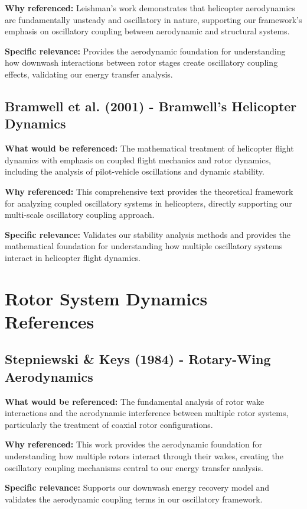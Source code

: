 \documentclass{article}
\begin{document}
\textbf{Why referenced:} Leishman's work demonstrates that helicopter aerodynamics are fundamentally unsteady and oscillatory in nature, supporting our framework's emphasis on oscillatory coupling between aerodynamic and structural systems.

\textbf{Specific relevance:} Provides the aerodynamic foundation for understanding how downwash interactions between rotor stages create oscillatory coupling effects, validating our energy transfer analysis.

\subsection{Bramwell et al. (2001) - Bramwell's Helicopter Dynamics}

\textbf{What would be referenced:} The mathematical treatment of helicopter flight dynamics with emphasis on coupled flight mechanics and rotor dynamics, including the analysis of pilot-vehicle oscillations and dynamic stability.

\textbf{Why referenced:} This comprehensive text provides the theoretical framework for analyzing coupled oscillatory systems in helicopters, directly supporting our multi-scale oscillatory coupling approach.

\textbf{Specific relevance:} Validates our stability analysis methods and provides the mathematical foundation for understanding how multiple oscillatory systems interact in helicopter flight dynamics.

\section{Rotor System Dynamics References}

\subsection{Stepniewski & Keys (1984) - Rotary-Wing Aerodynamics}

\textbf{What would be referenced:} The fundamental analysis of rotor wake interactions and the aerodynamic interference between multiple rotor systems, particularly the treatment of coaxial rotor configurations.

\textbf{Why referenced:} This work provides the aerodynamic foundation for understanding how multiple rotors interact through their wakes, creating the oscillatory coupling mechanisms central to our energy transfer analysis.

\textbf{Specific relevance:} Supports our downwash energy recovery model and validates the aerodynamic coupling terms in our oscillatory framework.
\end{document}
